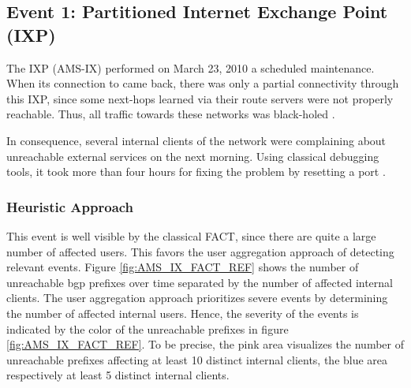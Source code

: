 \subsection{Event 1: Partitioned Internet Exchange Point (IXP)}

The IXP \citet{AMS-IX}(AMS-IX) performed on March 23, 2010 a scheduled maintenance. 
When its connection to \citet{switch} came back, there was only a partial connectivity through this IXP, since some next-hops learned via their route servers were not properly reachable. Thus, all traffic towards these networks was black-holed \citep{SchatzmannPAM2011}.

In consequence, several internal clients of the \citet{switch} network were complaining about unreachable external services on the next morning. 
Using classical debugging tools, it took more than four hours for fixing the problem by resetting a port \citep{SchatzmannPAM2011}.

\subsubsection{Heuristic Approach} 
This event is well visible by the classical \gls{FACT}, since there are quite a large number of affected users. This favors the user aggregation approach of detecting relevant events. 
Figure \ref{fig:AMS_IX_FACT_REF} shows the number of unreachable \gls{bgp} prefixes over time separated by the number of affected internal clients. 
The user aggregation approach prioritizes severe events by determining the number of affected internal users. 
Hence, the severity of the events is indicated by the color of the unreachable prefixes in figure \ref{fig:AMS_IX_FACT_REF}. 
To be precise, the pink area visualizes the number of unreachable prefixes affecting at least 10 distinct internal clients, the blue area respectively at least 5 distinct internal clients.

